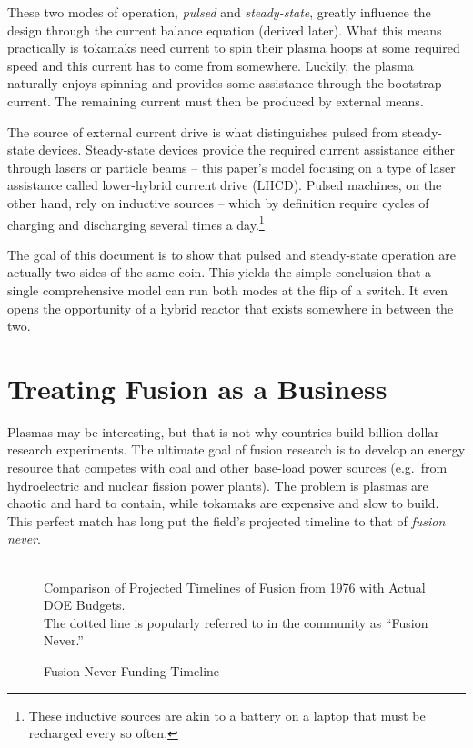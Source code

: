 These two modes of operation, \emph{pulsed} and \emph{steady-state}, greatly influence the design through the current balance equation (derived later). What this means practically is tokamaks need current to spin their plasma hoops at some required speed and this current has to come from somewhere. Luckily, the plasma naturally enjoys spinning and provides some assistance through the bootstrap current. The remaining current must then be produced by external means.

The source of external current drive is what distinguishes pulsed from steady-state devices. Steady-state devices provide the required current assistance either through lasers or particle beams -- this paper's model focusing on a type of laser assistance called lower-hybrid current drive (LHCD). \cite{jeff} Pulsed machines, on the other hand, rely on inductive sources -- which by definition require cycles of charging and discharging several times a day.\footnote{ These inductive sources are akin to a battery on a laptop that must be recharged every so often. }

The goal of this document is to show that pulsed and steady-state operation are actually two sides of the same coin. This yields the simple conclusion that a single comprehensive model can run both modes at the flip of a switch. It even opens the opportunity of a hybrid reactor that exists somewhere in between the two.

\section{Treating Fusion as a Business}

Plasmas may be interesting, but that is not why countries build billion dollar research experiments. The ultimate goal of fusion research is to develop an energy resource that competes with coal and other base-load power sources (e.g.\ from hydroelectric and nuclear fission power plants). The problem is plasmas are chaotic and hard to contain, while tokamaks are expensive and slow to build. This perfect match has long put the field's projected timeline to that of \emph{fusion never}. \cite{fusionfunding}

\begin{figure}[h]
	\centering
	\begin{adjustbox}{width=0.75\textwidth}
		
	\end{adjustbox}
	\caption{Fusion Never Funding Timeline} ~\\
	\small Comparison of Projected Timelines of Fusion from 1976 with Actual DOE Budgets. \cite{doe87, doe19} \\ The dotted line is popularly referred to in the community as ``Fusion Never.'' \cite{fusionnever}
\end{figure}

